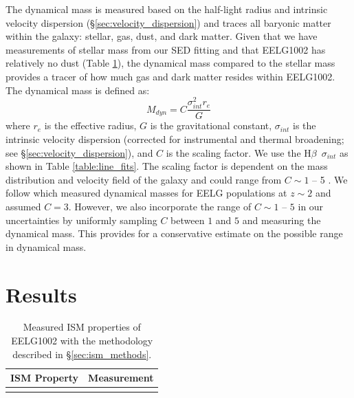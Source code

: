 \documentclass[twocolumn,tight,times,linenumbers]{aastex631}
\newcommand{\hbeta}{H$\beta$}
\begin{document}
	The dynamical mass is measured based on the half-light radius and intrinsic velocity dispersion (\S\ref{sec:velocity_dispersion}) and traces all baryonic matter within the galaxy: stellar, gas, dust, and dark matter. Given that we have measurements of stellar mass from our SED fitting and that EELG1002 has relatively no dust (Table \ref{table:ISM}), the dynamical mass compared to the stellar mass provides a tracer of how much gas and dark matter resides within EELG1002. The dynamical mass is defined as:
	\begin{equation}
		M_{dyn} = C \frac{\sigma_{int}^2 r_e}{G}
		\label{eqn:dynamical_mass}
	\end{equation}
    where $r_e$ is the effective radius, $G$ is the gravitational constant, $\sigma_{int}$ is the intrinsic velocity dispersion (corrected for instrumental and thermal broadening; see \S\ref{sec:velocity_dispersion}), and $C$ is the scaling factor. We use the \hbeta~$\sigma_{int}$ as shown in Table \ref{table:line_fits}. The scaling factor is dependent on the mass distribution and velocity field of the galaxy and could range from $C \sim 1$ -- 5 \citep{Erb2006}. We follow \citet{Maseda2013} which measured dynamical masses for EELG populations at $z \sim 2$ and assumed $C = 3$. However, we also incorporate the range of $C \sim 1$ -- $5$ in our uncertainties by uniformly sampling $C$ between $1$ and $5$ and measuring the dynamical mass. This provides for a conservative estimate on the possible range in dynamical mass. 


		\section{Results}
            \label{sec:results}
		\begin{table}
		\centering
		\caption{Measured ISM properties of EELG1002 with the methodology described in \S\ref{sec:ism_methods}.}
		\label{table:ISM}
		{\renewcommand{\arraystretch}{1.12}
			\begin{tabular*}{\columnwidth}{@{\extracolsep{\fill}}lc}
				\hline
				ISM Property & Measurement \\
				\hline
				\ISMandLineTable
				\hline
				\end{tabular*}
			}
		\end{table}
\end{document}
